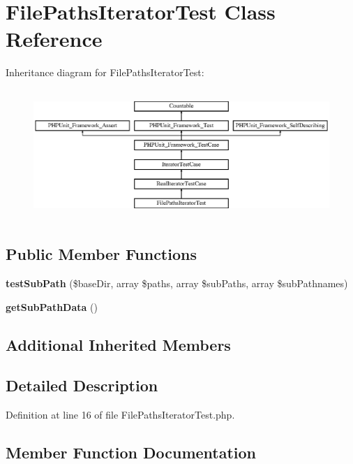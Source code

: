 \section{File\+Paths\+Iterator\+Test Class Reference}
\label{class_symfony_1_1_component_1_1_finder_1_1_tests_1_1_iterator_1_1_file_paths_iterator_test}
Inheritance diagram for File\+Paths\+Iterator\+Test\+:\begin{figure}[H]
\begin{center}
\leavevmode
\includegraphics[height=4.955752cm]{class_symfony_1_1_component_1_1_finder_1_1_tests_1_1_iterator_1_1_file_paths_iterator_test}
\end{center}
\end{figure}
\subsection*{Public Member Functions}
\begin{DoxyCompactItemize}
\item 
{\bf test\+Sub\+Path} (\$base\+Dir, array \$paths, array \$sub\+Paths, array \$sub\+Pathnames)
\item 
{\bf get\+Sub\+Path\+Data} ()
\end{DoxyCompactItemize}
\subsection*{Additional Inherited Members}


\subsection{Detailed Description}


Definition at line 16 of file File\+Paths\+Iterator\+Test.\+php.



\subsection{Member Function Documentation}
